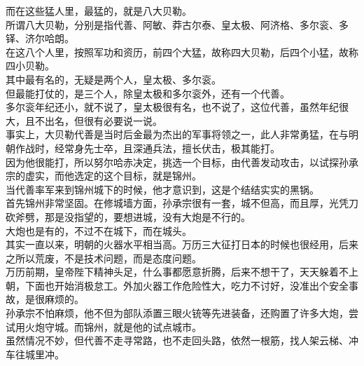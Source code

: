 \begin{multicols}{\theparacolNo}
而在这些猛人里，最猛的，就是八大贝勒。\\

所谓八大贝勒，分别是指代善、阿敏、莽古尔泰、皇太极、阿济格、多尔衮、多铎、济尔哈朗。\\

在这八个人里，按照军功和资历，前四个大猛，故称四大贝勒，后四个小猛，故称四小贝勒。\\

其中最有名的，无疑是两个人，皇太极、多尔衮。\\

但最能打仗的，是三个人，除皇太极和多尔衮外，还有一个代善。\\

多尔衮年纪还小，就不说了，皇太极很有名，也不说了，这位代善，虽然年纪很大，且不出名，但很有必要说一说。\\

事实上，大贝勒代善是当时后金最为杰出的军事将领之一，此人非常勇猛，在与明朝作战时，经常身先士卒，且深通兵法，擅长伏击，极其能打。\\

因为他很能打，所以努尔哈赤决定，挑选一个目标，由代善发动攻击，以试探孙承宗的虚实，而他选定的这个目标，就是锦州。\\

当代善率军来到锦州城下的时候，他才意识到，这是个结结实实的黑锅。\\

首先锦州非常坚固。在修城墙方面，孙承宗很有一套，城不但高，而且厚，光凭刀砍斧劈，那是没指望的，要想进城，没有大炮是不行的。\\

大炮也是有的，不过不在城下，而在城头。\\

其实一直以来，明朝的火器水平相当高。万历三大征打日本的时候也很经用，后来之所以荒废，不是技术问题，而是态度问题。\\

万历前期，皇帝陛下精神头足，什么事都愿意折腾，后来不想干了，天天躲着不上朝，下面也开始消极怠工。外加火器工作危险性大，吃力不讨好，没准出个安全事故，是很麻烦的。\\

孙承宗不怕麻烦，他不但为部队添置三眼火铳等先进装备，还购置了许多大炮，尝试用火炮守城。而锦州，就是他的试点城市。\\

虽然情况不妙，但代善不走寻常路，也不走回头路，依然一根筋，找人架云梯、冲车往城里冲。\\


\end{multicols}
